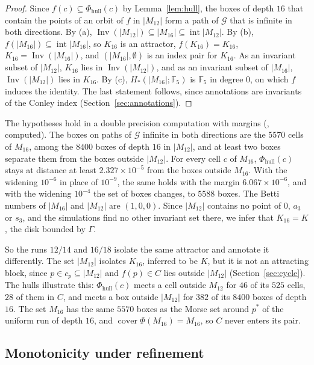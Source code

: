 \documentclass[11pt]{article}
\theoremstyle{plain}
\theoremstyle{definition}
\theoremstyle{remark}
\DeclareMathOperator{\Inv}{Inv}
\DeclareMathOperator{\cover}{cover}
\DeclareMathOperator{\interior}{int}
\newcommand{\F}{\mathbb{F}_5}
\newcommand{\Phihull}{\Phi_{\mathrm{hull}}}
\begin{document}
\begin{proof}
Since $f(c)\subseteq\Phihull(c)$ by Lemma~\ref{lem:hull}, the boxes of depth $16$ that contain the points of an orbit of $f$ in $|M_{12}|$ form a path of $\mathcal{G}$ that is infinite in both directions. By (a), $\Inv(|M_{12}|)\subseteq|M_{16}|\subseteq\interior|M_{12}|$. By (b), $f(|M_{16}|)\subseteq\interior|M_{16}|$, so $K_{16}$ is an attractor, $f(K_{16})=K_{16}$, $K_{16}=\Inv(|M_{16}|)$, and $(|M_{16}|,\emptyset)$ is an index pair for $K_{16}$. As an invariant subset of $|M_{12}|$, $K_{16}$ lies in $\Inv(|M_{12}|)$, and as an invariant subset of $|M_{16}|$, $\Inv(|M_{12}|)$ lies in $K_{16}$. By (c), $H_*(|M_{16}|;\F)$ is $\F$ in degree $0$, on which $f$ induces the identity. The last statement follows, since annotations are invariants of the Conley index (Section~\ref{sec:annotations}).
\end{proof}

The hypotheses hold in a double precision computation with margins (, computed). The boxes on paths of $\mathcal{G}$ infinite in both directions are the $5570$ cells of $M_{16}$, among the $8400$ boxes of depth $16$ in $|M_{12}|$, and at least two boxes separate them from the boxes outside $|M_{12}|$. For every cell $c$ of $M_{16}$, $\Phihull(c)$ stays at distance at least $2.327\times10^{-5}$ from the boxes outside $M_{16}$. With the widening $10^{-6}$ in place of $10^{-9}$, the same holds with the margin $6.067\times10^{-6}$, and with the widening $10^{-4}$ the set of boxes changes, to $5588$ boxes. The Betti numbers of $|M_{16}|$ and $|M_{12}|$ are $(1,0,0)$. Since $|M_{12}|$ contains no point of $0$, $a_3$ or $s_3$, and the simulations find no other invariant set there, we infer that $K_{16}=K$, the disk bounded by $\Gamma$.

So the runs $12/14$ and $16/18$ isolate the same attractor and annotate it differently. The set $|M_{12}|$ isolates $K_{16}$, inferred to be $K$, but it is not an attracting block, since $p\in c_p\subseteq|M_{12}|$ and $f(p)\in C$ lies outside $|M_{12}|$ (Section~\ref{sec:cycle}). The hulls illustrate this: $\Phihull(c)$ meets a cell outside $M_{12}$ for $46$ of its $525$ cells, $28$ of them in $C$, and meets a box outside $|M_{12}|$ for $382$ of its $8400$ boxes of depth $16$. The set $M_{16}$ has the same $5570$ boxes as the Morse set around $p^*$ of the uniform run of depth $16$, and $\cover\Phi(M_{16})=M_{16}$, so $C$ never enters its pair.

\subsection{Monotonicity under refinement}\label{sec:monotone}
\end{document}
